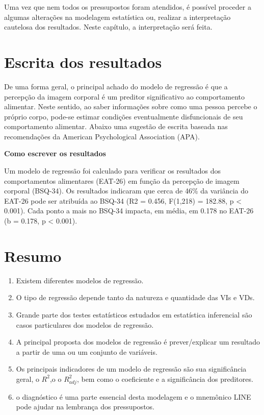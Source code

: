 \documentclass[
]{book}
\providecommand{\tightlist}{%
  \setlength{\itemsep}{0pt}\setlength{\parskip}{0pt}}
\begin{document}
Uma vez que nem todos os pressupostos foram atendidos, é possível proceder a algumas alterações na modelagem estatística ou, realizar a interpretação cautelosa dos resultados. Neste capítulo, a interpretação será feita.

\hypertarget{escrita-dos-resultados-13}{%
\section{Escrita dos resultados}\label{escrita-dos-resultados-13}}

De uma forma geral, o principal achado do modelo de regressão é que a percepção da imagem corporal é um preditor significativo ao comportamento alimentar. Neste sentido, ao saber informações sobre como uma pessoa percebe o próprio corpo, pode-se estimar condições eventualmente disfuncionais de seu comportamento alimentar. Abaixo uma sugestão de escrita baseada nas recomendações da American Psychological Association (APA).

\textbf{Como escrever os resultados}

Um modelo de regressão foi calculado para verificar os resultados dos comportamentos alimentares (EAT-26) em função da percepção de imagem corporal (BSQ-34). Os resultados indicaram que cerca de 46\% da variância do EAT-26 pode ser atribuída ao BSQ-34 (R2 = 0.456, F(1,218) = 182.88, p \textless{} 0.001). Cada ponto a mais no BSQ-34 impacta, em média, em 0.178 no EAT-26 (b = 0.178, p \textless{} 0.001).

\hypertarget{resumo-15}{%
\section{Resumo}\label{resumo-15}}

\begin{enumerate}
\def\labelenumi{\arabic{enumi}.}
\tightlist
\item
  Existem diferentes modelos de regressão.\\
\item
  O tipo de regressão depende tanto da natureza e quantidade das VIs e VDs.\\
\item
  Grande parte dos testes estatísticos estudados em estatística inferencial são casos particulares dos modelos de regressão.\\
\item
  A principal proposta dos modelos de regressão é prever/explicar um resultado a partir de uma ou um conjunto de variáveis.\\
\item
  Os principais indicadores de um modelo de regressão são sua significância geral, o \(R^2\),o o \(R^2_{adj}\), bem como o coeficiente e a significância dos preditores.\\
\item
  o diagnóstico é uma parte essencial desta modelagem e o mnemônico LINE pode ajudar na lembrança dos pressupostos.\\
\end{enumerate}
\end{document}
